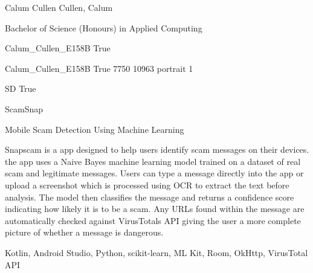 
\begingroup{}\relax



\def\Key{Calum_Cullen_E158B}

{Calum Cullen}
{Cullen, Calum}

{Bachelor of Science (Honours) in Applied Computing}

{Calum_Cullen_E158B}
{True}

{Calum_Cullen_E158B}
{True}
{7750}
{10963}
{portrait}
{1}

{SD}
{True}

{ScamSnap}

{Mobile Scam Detection Using Machine Learning}

{Snapscam is a app designed to help users identify scam messages on their devices. the app uses a Naive Bayes machine learning model trained on a dataset of real scam and legitimate messages. Users can type a message directly into the app or upload a screenshot which is processed using OCR to extract the text before analysis. The model then classifies the message and returns a confidence score indicating how likely it is to be a scam. Any URLs found within the message are automatically checked against VirusTotals API giving the user a more complete picture of whether a message is dangerous.}

{Kotlin, Android Studio, Python, scikit-learn, ML Kit, Room, OkHttp, VirusTotal API}

